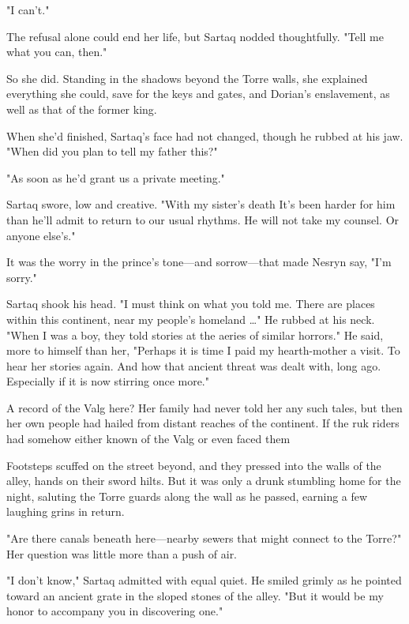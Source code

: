 "I can't."

The refusal alone could end her life, but Sartaq nodded thoughtfully. "Tell me what you can, then."

So she did. Standing in the shadows beyond the Torre walls, she explained everything she could, save for the keys and gates, and Dorian's enslavement, as well as that of the former king.

When she'd finished, Sartaq's face had not changed, though he rubbed at his jaw. "When did you plan to tell my father this?"

"As soon as he'd grant us a private meeting."

Sartaq swore, low and creative. "With my sister's death  It's been harder for him than he'll admit to return to our usual rhythms. He will not take my counsel. Or anyone else's."

It was the worry in the prince's tone---and sorrow---that made Nesryn say, "I'm sorry."

Sartaq shook his head. "I must think on what you told me. There are places within this continent, near my people's homeland \ldots" He rubbed at his neck. "When I was a boy, they told stories at the aeries of similar horrors." He said, more to himself than her, "Perhaps it is time I paid my hearth-mother a visit. To hear her stories again. And how that ancient threat was dealt with, long ago. Especially if it is now stirring once more."

A record of the Valg  here? Her family had never told her any such tales, but then her own people had hailed from distant reaches of the continent. If the ruk riders had somehow either known of the Valg or even faced them 

Footsteps scuffed on the street beyond, and they pressed into the walls of the alley, hands on their sword hilts. But it was only a drunk stumbling home for the night, saluting the Torre guards along the wall as he passed, earning a few laughing grins in return.

"Are there canals beneath here---nearby sewers that might connect to the Torre?" Her question was little more than a push of air.

"I don't know," Sartaq admitted with equal quiet. He smiled grimly as he pointed toward an ancient grate in the sloped stones of the alley. "But it would be my honor to accompany you in discovering one."

